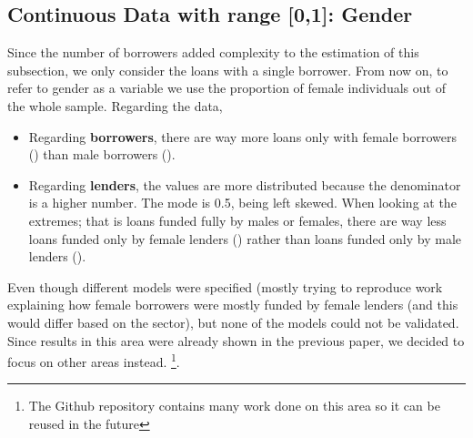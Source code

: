 \subsection{Continuous Data with range [0,1]: Gender}
Since the number of borrowers added complexity to the estimation of this subsection, we only consider the loans with a single borrower. From now on, to refer to gender as a variable we use the proportion of female individuals out of the whole sample. Regarding the data,
\begin{itemize}
\item Regarding \textbf{borrowers}, there are way more loans only with female borrowers () than male borrowers ().
\item Regarding \textbf{lenders}, the values are more distributed because the denominator is a higher number. The mode is 0.5, being left skewed. When looking at the extremes; that is loans funded fully by males or females, there are way less loans funded only by female lenders () rather than loans funded only by male lenders ().
\end{itemize}
 
Even though different models were specified (mostly trying to reproduce \textcite{Greenberg2015} work explaining how female borrowers were mostly funded by female lenders (and this would differ based on the sector), but none of the models could not be validated. Since results in this area were already shown in the previous paper, we decided to focus on other areas instead. \footnote{The Github repository contains many work done on this area so it can be reused in the future}. 

% 
% 


